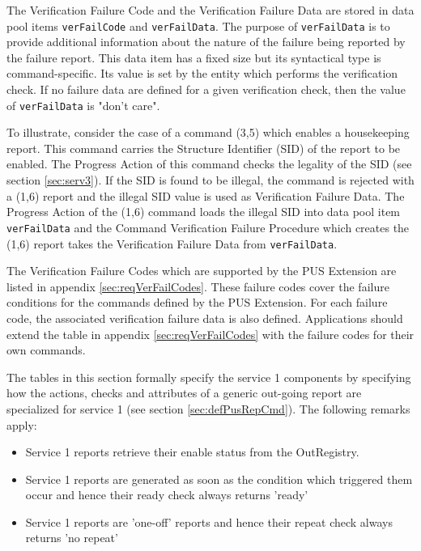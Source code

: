 \documentclass{pnp_article}
\begin{document}
The Verification Failure Code and the Verification Failure Data are stored in data pool items \texttt{verFailCode} and \texttt{verFailData}. The purpose of \texttt{verFailData} is to provide additional information about the nature of the failure being reported by the failure report. This data item has a fixed size but its syntactical type is command-specific. Its value is set by the entity which performs the verification check. If no failure data are defined for a given verification check, then the value of \texttt{verFailData} is "don't care". 

To illustrate, consider the case of a command (3,5) which enables a housekeeping report. This command carries the Structure Identifier (SID) of the report to be enabled. The Progress Action of this command checks the legality of the SID (see section \ref{sec:serv3}). If the SID is found to be illegal, the command is rejected with a (1,6) report and the illegal SID value is used as Verification Failure Data. The Progress Action of the (1,6) command loads the illegal SID into data pool item \texttt{verFailData} and the Command Verification Failure Procedure which creates the (1,6) report takes the Verification Failure Data from \texttt{verFailData}.

The Verification Failure Codes which are supported by the PUS Extension are listed in appendix \ref{sec:reqVerFailCodes}. These failure codes cover the failure conditions for the commands defined by the PUS Extension. For each failure code, the associated verification failure data is also defined. Applications should extend the table in appendix \ref{sec:reqVerFailCodes} with the failure codes for their own commands. 

The tables in this section formally specify the service 1 components by specifying how the actions, checks and attributes of a generic out-going report are specialized for service 1 (see section \ref{sec:defPusRepCmd}). The following remarks apply: 

\begin{itemize}
\item Service 1 reports retrieve their enable status from the OutRegistry.
\item Service 1 reports are generated as soon as the condition which triggered them occur and hence their ready check always returns 'ready'
\item Service 1 reports are 'one-off' reports and hence their repeat check always returns 'no repeat'
\end{itemize}
\end{document}
